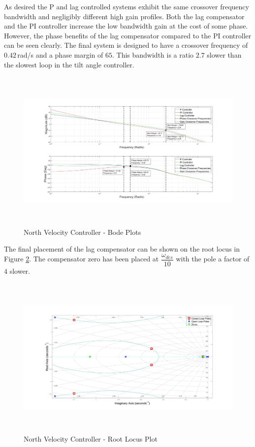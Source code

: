 	As desired the P and lag controlled systems exhibit the same crossover frequency bandwidth and negligibly different high gain profiles. Both the lag compensator and the PI controller increase the low bandwidth gain at the cost of some phase. However, the phase benefits of the lag compensator compared to the PI controller can be seen clearly. The final system is designed to have a crossover frequency of $0.42$\,rad/s and a phase margin of $65$\textdegree. This bandwidth is a ratio $2.7$ slower than the slowest loop in the tilt angle controller.
			
	\begin{figure}[H]
		\centering
		\includegraphics[height = 8cm]{../Design/Matlab/Controllers/north_velocity_bode.jpg}
		\caption{North Velocity Controller -  Bode Plots}
		\label{IM_NorthVelControlBode}
	\end{figure}
	
	The final placement of the lag compensator can be shown on the root locus in Figure \ref{IM_NorthVelControlRoot}. The compensator zero has been placed at $\dfrac{\omega_{des}}{10}$ with the pole a factor of $4$ slower.
	
	\begin{figure}[H]
		\centering
		\includegraphics[height = 8cm]{../Design/Matlab/Controllers/north_velocity_root.jpg}
		\caption{North Velocity Controller -  Root Locus Plot}
		\label{IM_NorthVelControlRoot}
	\end{figure}	
	
